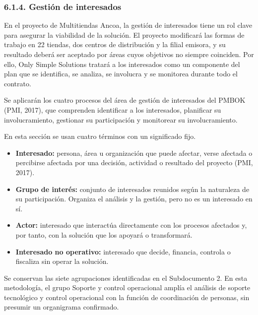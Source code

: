 \documentclass[11pt]{article}
\begin{document}
\subsubsection{6.1.4. Gestión de interesados}\label{6-1-4-gestion-de-interesados}

En el proyecto de Multitiendas Ancoa, la gestión de interesados tiene un rol clave para asegurar la viabilidad de la solución. El proyecto modificará las formas de trabajo en 22 tiendas, dos centros de distribución y la filial emisora, y su resultado deberá ser aceptado por áreas cuyos objetivos no siempre coinciden. Por ello, Only Simple Solutions tratará a los interesados como un componente del plan que se identifica, se analiza, se involucra y se monitorea durante todo el contrato.

Se aplicarán los cuatro procesos del área de gestión de interesados del
PMBOK (PMI, 2017), que comprenden identificar a los interesados,
planificar su involucramiento, gestionar su participación y monitorear
su involucramiento.

En esta sección se usan cuatro términos con un significado fijo.

\begin{itemize}
\item
  \textbf{Interesado:} persona, área u organización que puede afectar,
  verse afectada o percibirse afectada por una decisión, actividad o
  resultado del proyecto (PMI, 2017).
\item
  \textbf{Grupo de interés:} conjunto de interesados reunidos según la
  naturaleza de su participación. Organiza el análisis y la gestión,
  pero no es un interesado en sí.
\item
  \textbf{Actor:} interesado que interactúa directamente con los
  procesos afectados y, por tanto, con la solución que los apoyará o
  transformará.
\item
  \textbf{Interesado no operativo:} interesado que decide, financia,
  controla o fiscaliza sin operar la solución.
\end{itemize}

Se conservan las siete agrupaciones identificadas en el Subdocumento 2.
En esta metodología, el grupo Soporte y control operacional amplía el
análisis de soporte tecnológico y control operacional con la función de
coordinación de personas, sin presumir un organigrama confirmado.
\end{document}
